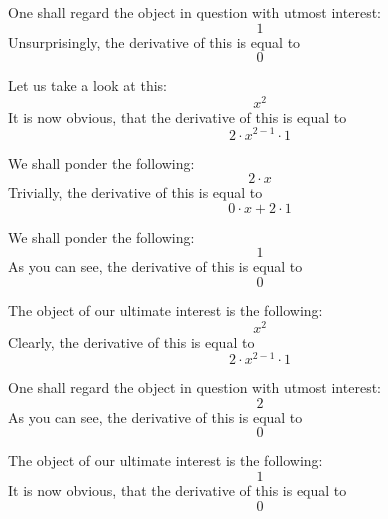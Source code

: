 \documentclass{article}
\begin{document}
One shall regard the object in question with utmost interest:
\begin{equation}
1 
\end{equation}
Unsurprisingly, the derivative of this is equal to
\begin{equation}
0 
\end{equation}

Let us take a look at this:
\begin{equation}
x ^{2 } 
\end{equation}
It is now obvious, that the derivative of this is equal to
\begin{equation}
2 \cdot x ^{2 - 1 } \cdot 1 
\end{equation}

We shall ponder the following:
\begin{equation}
2 \cdot x 
\end{equation}
Trivially, the derivative of this is equal to
\begin{equation}
0 \cdot x + 2 \cdot 1 
\end{equation}

We shall ponder the following:
\begin{equation}
1 
\end{equation}
As you can see, the derivative of this is equal to
\begin{equation}
0 
\end{equation}

The object of our ultimate interest is the following:
\begin{equation}
x ^{2 } 
\end{equation}
Clearly, the derivative of this is equal to
\begin{equation}
2 \cdot x ^{2 - 1 } \cdot 1 
\end{equation}

One shall regard the object in question with utmost interest:
\begin{equation}
2 
\end{equation}
As you can see, the derivative of this is equal to
\begin{equation}
0 
\end{equation}

The object of our ultimate interest is the following:
\begin{equation}
1 
\end{equation}
It is now obvious, that the derivative of this is equal to
\begin{equation}
0 
\end{equation}
\end{document}
